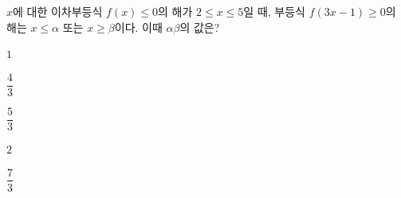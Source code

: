 \hspace*{2mm}\begin{minipage}[t]{\dimexpr\linewidth-2mm\relax}\vspace{0pt}
$x$에 대한 이차부등식 $f(x)\le 0$의 해가 $2\le x\le 5$일 때, 부등식 $f(3x-1)\ge 0$의 해는 $x\le \alpha$ 또는 $x\ge \beta$이다. 이때 $\alpha\beta$의 값은?
\begin{choices32}{\rule[-3ex]{0pt}{8ex}$1$}{\rule[-3ex]{0pt}{8ex}$\dfrac{4}{3}$}{\rule[-3ex]{0pt}{8ex}$\dfrac{5}{3}$}{\rule[-3ex]{0pt}{8ex}$2$}{\rule[-3ex]{0pt}{8ex}$\dfrac{7}{3}$}\end{choices32}\end{minipage}
